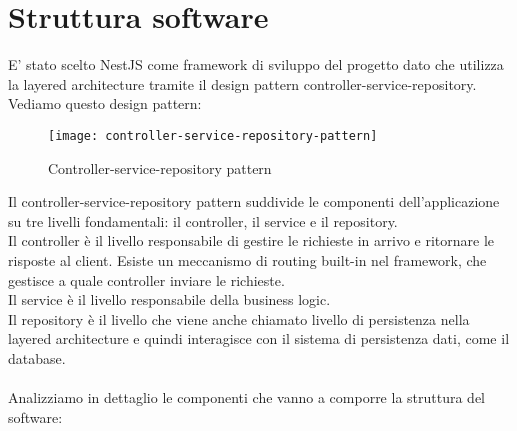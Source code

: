 \section{Struttura software}
E' stato scelto NestJS come framework di sviluppo del progetto dato che utilizza la layered architecture
tramite il design pattern controller-service-repository. Vediamo questo design pattern:
\begin{figure}[H]
    \centering
    \texttt{[image: controller-service-repository-pattern]}
    \caption{Controller-service-repository pattern}
\end{figure}
\leavevmode\newline
Il controller-service-repository pattern suddivide le componenti dell'applicazione su tre livelli fondamentali:
il controller, il service e il repository.
\\
Il controller è il livello responsabile di gestire le richieste in arrivo e ritornare le risposte al client.
Esiste un meccanismo di routing built-in nel framework, che gestisce a quale controller inviare le richieste.
\\
Il service è il livello responsabile della business logic.
\\
Il repository è il livello che viene anche chiamato livello di persistenza nella layered architecture e quindi interagisce
con il sistema di persistenza dati, come il database.
\\\\
Analizziamo in dettaglio le componenti che vanno a comporre la struttura del software:
